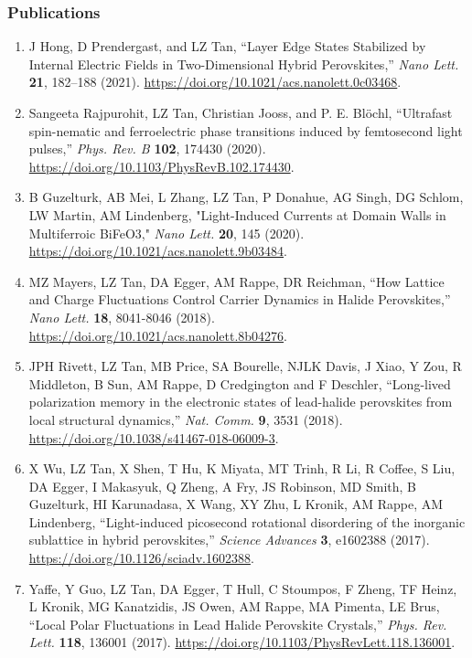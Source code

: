 \subsubsection*{Publications}
\begin{enumerate}
    \item J Hong, D Prendergast, and LZ Tan, “Layer Edge States Stabilized by Internal Electric Fields in Two-Dimensional Hybrid Perovskites,” {\it Nano Lett.} {\bf 21}, 182–188 (2021). \url{https://doi.org/10.1021/acs.nanolett.0c03468}.
    \item Sangeeta Rajpurohit, LZ Tan, Christian Jooss, and P. E. Blöchl, “Ultrafast spin-nematic and ferroelectric phase transitions induced by femtosecond light pulses,” {\it Phys. Rev. B} {\bf 102}, 174430 (2020). \url{https://doi.org/10.1103/PhysRevB.102.174430}.
    \item B Guzelturk, AB Mei, L Zhang, LZ Tan, P Donahue, AG Singh, DG Schlom, LW Martin, AM Lindenberg, "Light-Induced Currents at Domain Walls in Multiferroic BiFeO3," {\it Nano Lett.} {\bf 20}, 145 (2020). \url{https://doi.org/10.1021/acs.nanolett.9b03484}.
    \item MZ Mayers, LZ Tan, DA Egger, AM Rappe, DR Reichman, “How Lattice and Charge Fluctuations Control Carrier Dynamics in Halide Perovskites,” {\it Nano Lett.} {\bf 18}, 8041-8046 (2018). \url{https://doi.org/10.1021/acs.nanolett.8b04276}.
    \item JPH Rivett, LZ Tan, MB Price, SA Bourelle, NJLK Davis, J Xiao, Y Zou, R Middleton, B Sun, AM Rappe, D Credgington and F Deschler, “Long-lived polarization memory in the electronic states of lead-halide perovskites from local structural dynamics,” {\it Nat. Comm.} {\bf 9}, 3531 (2018). \url{https://doi.org/10.1038/s41467-018-06009-3}.
    \item X Wu, LZ Tan, X Shen, T Hu, K Miyata, MT Trinh, R Li, R Coffee, S Liu, DA Egger, I Makasyuk, Q Zheng, A Fry, JS Robinson, MD Smith, B Guzelturk, HI Karunadasa, X Wang, XY Zhu, L Kronik, AM Rappe, AM Lindenberg, “Light-induced picosecond rotational disordering of the inorganic sublattice in hybrid perovskites,” {\it Science Advances} {\bf 3}, e1602388 (2017). \url{https://doi.org/10.1126/sciadv.1602388}.
    \item Yaffe, Y Guo, LZ Tan, DA Egger, T Hull, C Stoumpos, F Zheng, TF Heinz, L Kronik, MG Kanatzidis, JS Owen, AM Rappe, MA Pimenta, LE Brus, “Local Polar Fluctuations in Lead Halide Perovskite Crystals,” {\it Phys. Rev. Lett.} {\bf 118}, 136001 (2017). \url{https://doi.org/10.1103/PhysRevLett.118.136001}.

\end{enumerate}
